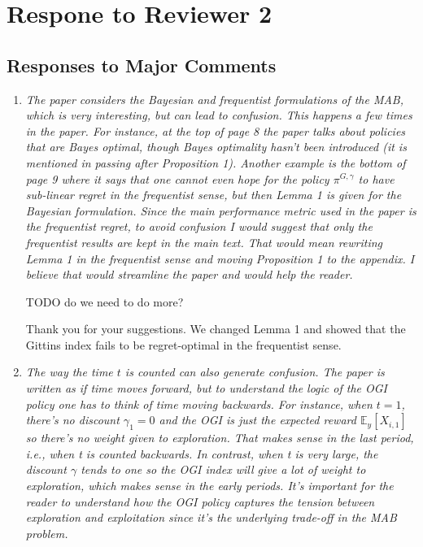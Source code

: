\documentclass[11pt]{article}
\newcommand{\1}{\ensuremath{\mathbf{1}}} %
\theoremstyle{thm-sf}
\begin{document}
	\newpage
	\section{Respone to Reviewer 2}
	
	\subsection{Responses to Major Comments}
	
	\begin{enumerate}
		\item {\it The paper considers the Bayesian and frequentist formulations of the MAB, which is very interesting, but can lead to confusion. This happens a few times in the paper. For instance, at the top of page 8 the paper talks about policies that are Bayes optimal, though Bayes optimality hasn't been introduced (it is mentioned in passing after Proposition 1). Another example is the bottom of page 9 where it says that one cannot even hope for the policy $\pi^{G,\gamma}$ to have sub-linear regret in the frequentist sense, but then Lemma 1 is given for the Bayesian formulation. Since the main performance metric used in the paper is the frequentist regret, to avoid confusion I would suggest that only the frequentist results are kept in the main text. That would mean rewriting Lemma 1 in the frequentist sense and moving Proposition 1 to the appendix. I believe that would streamline the paper and would help the reader.}
		
		{
			\color{blue}TODO do we need to do more?
			
			Thank you for your suggestions. We changed Lemma 1 and  showed that the Gittins index fails to be regret-optimal in the frequentist sense.
			
		}
		
		\item {\it The way the time $t$ is counted can also generate confusion. The paper is written as if time moves forward, but to understand the logic of the OGI policy one has to think of time moving backwards. For instance, when $t = 1$, there's no discount $\gamma_1 = 0$ and the OGI is just the expected reward $\mathbb E_y [X_{i,1}]$ so there's no weight given to exploration. That makes sense in the last period, i.e., when t is counted backwards. In contrast, when t is very large, the discount $\gamma$ tends to one so the OGI index will give a lot of weight to exploration, which makes sense in the early periods. It's important for the reader to understand how the OGI policy captures the tension between exploration and exploitation since it's the underlying trade-off in the MAB problem.
		}
	

\end{enumerate}
\end{document}
